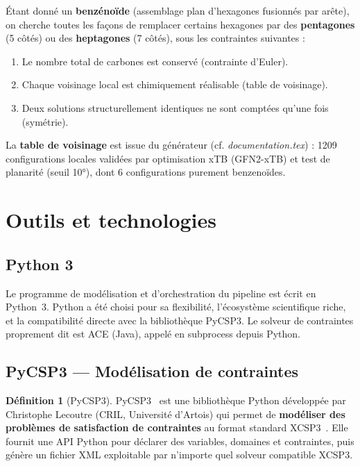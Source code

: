 \documentclass[12pt,a4paper]{article}
\theoremstyle{definition}
\newtheorem{definition}{Définition}[section]
\begin{document}
Étant donné un \textbf{benzénoïde} (assemblage plan d'hexagones fusionnés par arête), on cherche
toutes les façons de remplacer certains hexagones par des \textbf{pentagones} (5 côtés) ou des
\textbf{heptagones} (7 côtés), sous les contraintes suivantes :
\begin{enumerate}
  \item Le nombre total de carbones est conservé (contrainte d'Euler).
  \item Chaque voisinage local est chimiquement réalisable (table de voisinage).
  \item Deux solutions structurellement identiques ne sont comptées qu'une fois (symétrie).
\end{enumerate}

La \textbf{table de voisinage} est issue du générateur (cf. \textit{documentation.tex}) :
1209 configurations locales validées par optimisation xTB (GFN2-xTB) et test de planarité
(seuil 10°), dont 6 configurations purement benzenoïdes.

\section{Outils et technologies}

\subsection{Python 3}

Le programme de modélisation et d'orchestration du pipeline est écrit en Python~3. Python a été
choisi pour sa flexibilité, l'écosystème scientifique riche, et la compatibilité directe avec
la bibliothèque PyCSP3. Le solveur de contraintes proprement dit est ACE (Java), appelé en
subprocess depuis Python.

\subsection{PyCSP3 — Modélisation de contraintes}

\begin{definition}[PyCSP3]
  PyCSP3~\cite{pycsp3} est une bibliothèque Python développée par Christophe Lecoutre (CRIL,
  Université d'Artois) qui permet de \textbf{modéliser des problèmes de satisfaction de
  contraintes} au format standard XCSP3~\cite{xcsp3}. Elle fournit une API Python pour
  déclarer des variables, domaines et contraintes, puis génère un fichier XML exploitable
  par n'importe quel solveur compatible XCSP3.
\end{definition}
\end{document}
